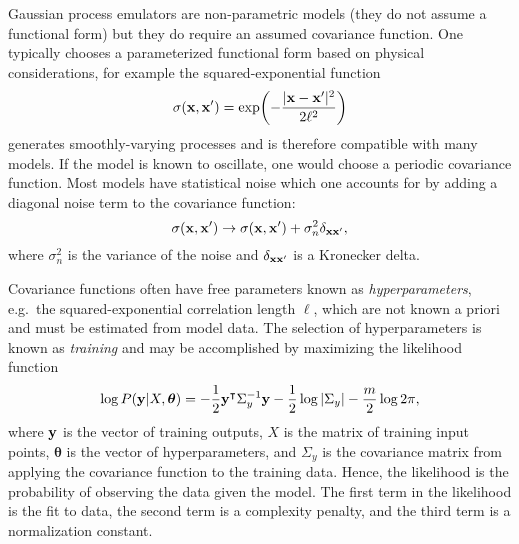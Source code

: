 \documentclass[aps,prc,reprint,superscriptaddress,amsmath]{revtex4-1}
\newcommand{\tran}{^\intercal}
\begin{document}
\newcommand{\vectheta}{\boldsymbol\theta}

Gaussian process emulators are non-parametric models (they do not assume a functional form) but they do require an assumed covariance function.
One typically chooses a parameterized functional form based on physical considerations, for example the squared-exponential function
\begin{equation*}
  \sigma(\mathbf x, \mathbf x') = \exp\biggl( -\frac{|\mathbf x - \mathbf x'|^2}{2\ell^2} \biggr)
\end{equation*}
generates smoothly-varying processes and is therefore compatible with many models.
If the model is known to oscillate, one would choose a periodic covariance function.
Most models have statistical noise which one accounts for by adding a diagonal noise term to the covariance function:
\begin{equation*}
  \sigma(\mathbf x, \mathbf x') \rightarrow \sigma(\mathbf x, \mathbf x') + \sigma_n^2\delta_{\mathbf x\mathbf x'},
\end{equation*}
where $\sigma_n^2$ is the variance of the noise and $\delta_{\mathbf x\mathbf x'}$ is a Kronecker delta.

Covariance functions often have free parameters known as \emph{hyperparameters}, e.g.\ the squared-exponential correlation length $\ell$,
which are not known a priori and must be estimated from model data.
The selection of hyperparameters is known as \emph{training} and may be accomplished by maximizing the likelihood function \cite{Rasmussen:2006gp}
\begin{equation}
  \log P(\y|X,\vectheta) = -\frac{1}{2} \y\tran \Sigma_y^{-1} \y - \frac{1}{2} \log |\Sigma_y| - \frac{m}{2} \log 2\pi,
  \label{eq:train_like}
\end{equation}
where $\mathbf y$ is the vector of training outputs, $X$ is the matrix of training input points, $\vectheta$ is the vector of hyperparameters, and $\Sigma_y$ is the covariance matrix from applying the covariance function to the training data.
Hence, the likelihood is the probability of observing the data given the model.
The first term in the likelihood is the fit to data, the second term is a complexity penalty, and the third term is a normalization constant.
\end{document}
